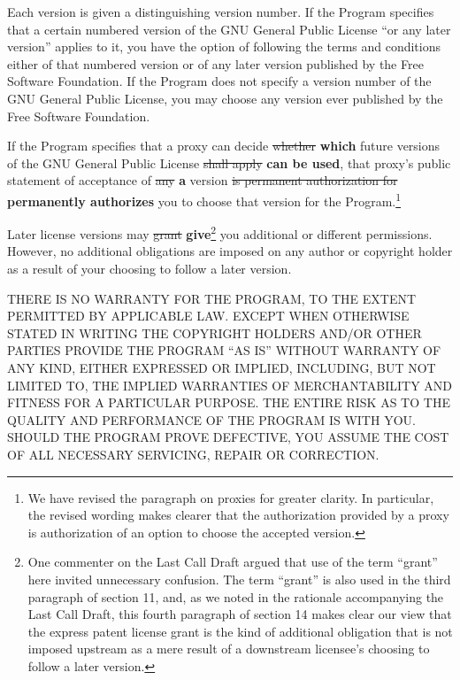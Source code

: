 \documentclass[11pt]{article}
\newcounter{v2section}
\newcounter{v3section}
\begin{document}
  Each version is given a distinguishing version number.  If the Program
specifies that a certain numbered version of the GNU General Public
License ``or any later version'' applies to it, you have the option of
following the terms and conditions either of that numbered version or of
any later version published by the Free Software Foundation.  If the
Program does not specify a version number of the GNU General Public
License, you may choose any version ever published by the Free Software
Foundation.

  If the Program specifies that a proxy can decide \sout{whether}
\textbf{which} future versions of the GNU General Public License
\sout{shall apply} \textbf{can be used}, that proxy's public statement
of acceptance of \sout{any} \textbf{a} version \sout{is permanent
authorization for} \textbf{permanently authorizes} you to choose that
version for the Program.\footnote{We have revised the paragraph on
proxies for greater clarity.  In particular, the revised wording makes
clearer that the authorization provided by a proxy is authorization of
an option to choose the accepted version.}

  Later license versions may \sout{grant} \textbf{give}\footnote{One
commenter on the Last Call Draft argued that use of the term ``grant''
here invited unnecessary confusion. The term ``grant'' is also used in
the third paragraph of section 11, and, as we noted in the rationale
accompanying the Last Call Draft, this fourth paragraph of section 14
makes clear our view that the express patent license grant is the kind
of additional obligation that is not imposed upstream as a mere result
of a downstream licensee's choosing to follow a later version.} you
additional or different permissions.  However, no additional obligations
are imposed on any author or copyright holder as a result of your
choosing to follow a later version.
  

  THERE IS NO WARRANTY FOR THE PROGRAM, TO THE EXTENT PERMITTED BY
APPLICABLE LAW.  EXCEPT WHEN OTHERWISE STATED IN WRITING THE COPYRIGHT
HOLDERS AND/OR OTHER PARTIES PROVIDE THE PROGRAM ``AS IS'' WITHOUT
WARRANTY OF ANY KIND, EITHER EXPRESSED OR IMPLIED, INCLUDING, BUT NOT
LIMITED TO, THE IMPLIED WARRANTIES OF MERCHANTABILITY AND FITNESS FOR A
PARTICULAR PURPOSE.  THE ENTIRE RISK AS TO THE QUALITY AND PERFORMANCE
OF THE PROGRAM IS WITH YOU.  SHOULD THE PROGRAM PROVE DEFECTIVE, YOU
ASSUME THE COST OF ALL NECESSARY SERVICING, REPAIR OR CORRECTION.
\end{document}
